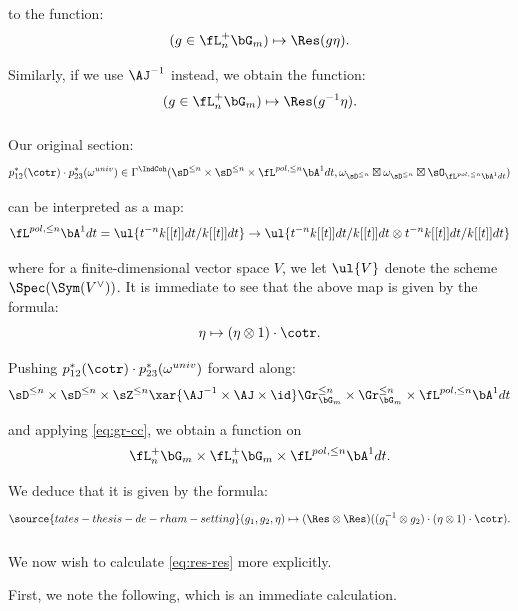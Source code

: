  to the function:
%
\[
(g \in \fL_n^+\bG_m) \mapsto \Res(g \eta).
\]

 Similarly, if we use $\AJ^{-1}$ instead, we obtain the
function:
%
\[
(g \in \fL_n^+\bG_m) \mapsto \Res(g^{-1} \eta).
\]

\subsubsection{}

Our original section:
%
\[
p_{12}^*(\cotr) \cdot p_{23}^*(\omega^{univ}) \in
\Gamma^{\IndCoh}(\sD^{\leq n} \times \sD^{\leq n} \times
\fL^{pol,\leq n} \bA^1 dt,
\omega_{\sD^{\leq n}} \boxtimes \omega_{\sD^{\leq n}} \boxtimes
\sO_{\fL^{pol,\leq n} \bA^1 dt})
\]

 can be interpreted as a map:
%
\[
\begin{gathered}
\fL^{pol,\leq n} \bA^1 dt =
\ul{t^{-n}k[[t]]dt/k[[t]]dt} \to
\ul{t^{-n}k[[t]]dt/k[[t]]dt \otimes t^{-n}k[[t]]dt/k[[t]]dt}
\end{gathered}
\]

 where for a finite-dimensional vector
space $V$, we let $\ul{V}$ denote the scheme $\Spec(\Sym(V^{\vee}))$.
It is immediate to see that the above map is given
by the formula:
%
\[
\eta \mapsto (\eta \otimes 1) \cdot \cotr.
\]

Pushing $p_{12}^*(\cotr) \cdot p_{23}^*(\omega^{univ})$ forward along:
%
\[
\sD^{\leq n} \times \sD^{\leq n} \times \sZ^{\leq n}
\xar{\AJ^{-1} \times \AJ \times \id}
\Gr_{\bG_m}^{\leq n} \times \Gr_{\bG_m}^{\leq n} \times \fL^{pol,\leq n} \bA^1 dt
\]

 and applying \eqref{eq:gr-cc}, we obtain a function on
%
\[
\fL_n^+\bG_m \times \fL_n^+\bG_m \times \fL^{pol,\leq n} \bA^1 dt.
\]

 We deduce that it is given by the formula:
%
\begin{equation}\label{eq:res-res}
\source{tates-thesis-de-rham-setting}
(g_1,g_2,\eta) \mapsto
(\Res \otimes \Res)((g_1^{-1} \otimes g_2) \cdot
(\eta \otimes 1) \cdot \cotr).
\end{equation}

\subsubsection{}

We now wish to calculate \eqref{eq:res-res} more explicitly.

First, we note the following, which is an immediate calculation.


